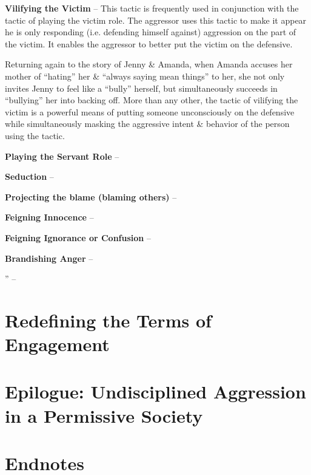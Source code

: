 \documentclass{article}
\numberwithin{equation}{section}
\begin{document}
\textbf{Vilifying the Victim} -- This tactic is frequently used in conjunction with the tactic of playing the victim role. The aggressor uses this tactic to make it appear he is only responding (i.e. defending himself against) aggression on the part of the victim. It enables the aggressor to better put the victim on the defensive.

Returning again to the story of Jenny \& Amanda, when Amanda accuses her mother of ``hating'' her \& ``always saying mean things'' to her, she not only invites Jenny to feel like a ``bully'' herself, but simultaneously succeeds in ``bullying'' her into backing off. More than any other, the tactic of vilifying the victim is a powerful means of putting someone unconsciously on the defensive while simultaneously masking the aggressive intent \& behavior of the person using the tactic.

\textbf{Playing the Servant Role} -- 

\textbf{Seduction} -- 

\textbf{Projecting the blame (blaming others)} -- 

\textbf{Feigning Innocence} --

\textbf{Feigning Ignorance or Confusion} -- 

\textbf{Brandishing Anger} -- 

'' -- \cite[pp. 91--]{Simon2010}


\section{Redefining the Terms of Engagement}


\section{Epilogue: Undisciplined Aggression in a Permissive Society}


\section{Endnotes}


\printbibliography[heading=bibintoc]
	
\end{document}
